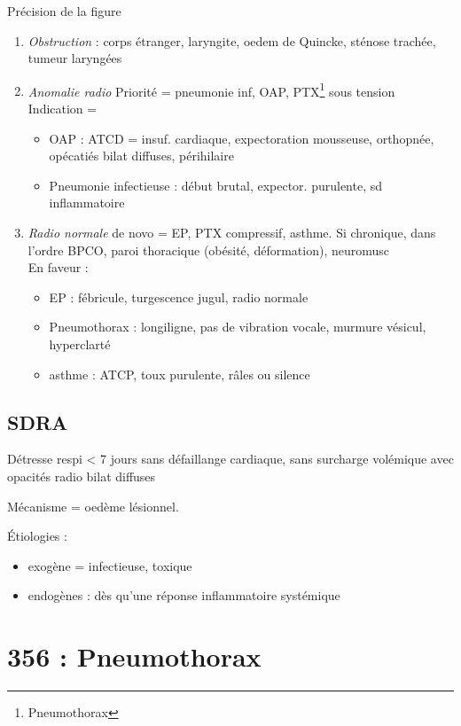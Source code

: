 \documentclass{article}
\begin{document}
Précision de la figure~
\begin{enumerate}
  \item \textit{Obstruction}  : corps étranger, laryngite, oedem de Quincke, sténose
    trachée, tumeur laryngées
  \item \textit{Anomalie radio} Priorité = pneumonie inf, OAP,
    PTX\footnote{Pneumothorax} sous
    tension\\
    Indication =
    \begin{itemize}
    \item OAP : {ATCD = insuf. cardiaque}, {expectoration mousseuse, orthopnée},
      {opécatiés bilat diffuses, périhilaire}
    \item Pneumonie infectieuse : {début brutal}, {expector. purulente}, {sd
      inflammatoire}
    \end{itemize}
  \item \textit{Radio normale} de novo = EP, PTX compressif, asthme. Si
    chronique, dans l'ordre BPCO, paroi thoracique (obésité, déformation),
    neuromusc\\
    En faveur :
    \begin{itemize}
      \item EP : fébricule, turgescence jugul, radio normale
      \item Pneumothorax : {longiligne}, {pas de vibration vocale}, murmure vésicul,
        {hyperclarté}
      \item asthme : ATCP, {toux purulente}, {râles ou silence}
    \end{itemize}
\end{enumerate}

\subsection{SDRA}
Détresse respi < 7 jours sans défaillange cardiaque, sans surcharge volémique
avec opacités radio bilat diffuses

Mécanisme = oedème lésionnel.

Étiologies :
\begin{itemize}
  \item exogène = infectieuse, toxique
  \item endogènes : dès qu'une réponse inflammatoire systémique
\end{itemize}

\section{356 : Pneumothorax}%
\end{document}
